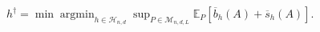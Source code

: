\(h^\dagger=\min\operatorname*{argmin}_{h\in\mathcal H_{n,d}}\sup_{P\in\mathcal M_{n,d,L}}\mathbb E_P[\overline b_h(A)+\overline s_h(A)]\).